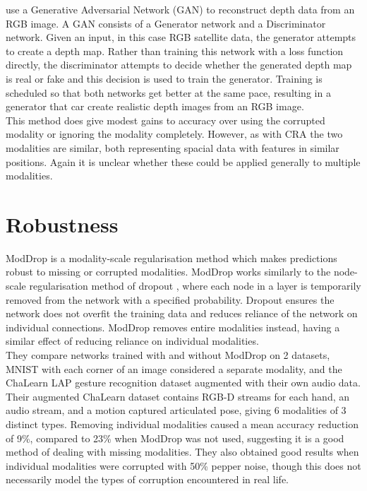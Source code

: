 \cite{GANFootprint} use a Generative Adversarial Network (GAN) to reconstruct depth data from an RGB image. A GAN consists of a Generator network and a Discriminator network. Given an input, in this case RGB satellite data, the generator attempts to create a depth map. Rather than training this network with a loss function directly, the discriminator attempts to decide whether the generated depth map is real or fake and this decision is used to train the generator. Training is scheduled so that both networks get better at the same pace, resulting in a generator that car create realistic depth images from an RGB image. \\

This method does give modest gains to accuracy over using the corrupted modality or ignoring the modality completely. However, as with CRA the two modalities are similar, both representing spacial data with features in similar positions. Again it is unclear whether these could be applied generally to multiple modalities.\\

\section{Robustness}
ModDrop \cite{ModDrop} is a modality-scale regularisation method which makes predictions robust to missing or corrupted modalities. ModDrop works similarly to the node-scale regularisation method of dropout \cite{dropout}, where each node in a layer is temporarily removed from the network with a specified probability. Dropout ensures the network does not overfit the training data and reduces reliance of the network on individual connections. ModDrop removes entire modalities instead, having a similar effect of reducing reliance on individual modalities. \\

They compare networks trained with and without ModDrop on 2 datasets, MNIST with each corner of an image considered a separate modality, and the ChaLearn LAP gesture recognition dataset augmented with their own audio data. Their augmented ChaLearn dataset contains RGB-D streams for each hand, an audio stream, and a motion captured articulated pose, giving 6 modalities of 3 distinct types. Removing individual modalities caused a mean accuracy reduction of 9\%, compared to 23\% when ModDrop was not used, suggesting it is a good method of dealing with missing modalities. They also obtained good results when individual modalities were corrupted with 50\% pepper noise, though this does not necessarily model the types of corruption encountered in real life.\\